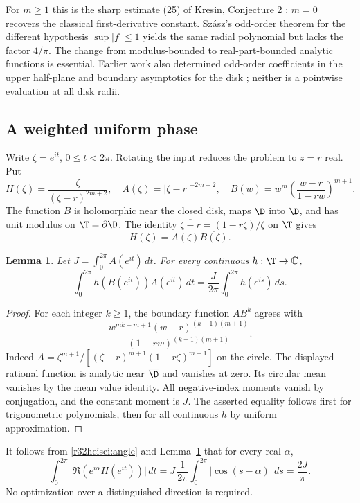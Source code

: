 \documentclass[11pt,a4paper]{article}
\numberwithin{equation}{section}
\newtheorem{lemma}[theorem]{Lemma}
\theoremstyle{definition}
\theoremstyle{remark}
\begin{document}
For $m\ge1$ this is the sharp estimate (25) of Kresin, Conjecture 2 \cite{r32heisei:K}; $m=0$ recovers the classical first-derivative constant. Sz\'asz's odd-order theorem for the different hypothesis $\sup|f|\le1$ yields the same radial polynomial but lacks the factor $4/\pi$. The change from modulus-bounded to real-part-bounded analytic functions is essential. Earlier work also determined odd-order coefficients in the upper half-plane and boundary asymptotics for the disk \cite{r32heisei:KM}; neither is a pointwise evaluation at all disk radii.

\subsection{A weighted uniform phase}
Write $\zeta=e^{it}$, $0\le t<2\pi$. Rotating the input reduces the problem to $z=r$ real. Put
\[
 H(\zeta)=\frac{\zeta}{(\zeta-r)^{2m+2}},\quad
 A(\zeta)=|\zeta-r|^{-2m-2},\quad
 B(w)=w^m\left(\frac{w-r}{1-rw}\right)^{m+1}.
\]
The function $B$ is holomorphic near the closed disk, maps $\D$ into $\D$, and has unit modulus on $\T=\partial\D$. The identity $\overline{\zeta-r}=(1-r\zeta)/\zeta$ on $\T$ gives
\begin{equation}\label{r32heisei:angle}
 H(\zeta)=A(\zeta)\overline{B(\zeta)}.
\end{equation}

\begin{lemma}\label{r32heisei:push}
Let $J=\int_0^{2\pi} A(e^{it})\,dt$. For every continuous $h:\T\to\mathbb C$,
\[
 \int_0^{2\pi} h(B(e^{it})) A(e^{it})\,dt
       =\frac{J}{2\pi}\int_0^{2\pi}h(e^{is})\,ds.
\]
\end{lemma}
\begin{proof}
For each integer $k\ge1$, the boundary function $AB^k$ agrees with
\[
 \frac{w^{mk+m+1}(w-r)^{(k-1)(m+1)}}
 {(1-rw)^{(k+1)(m+1)}}.
\]
Indeed $A=\zeta^{m+1}/[(\zeta-r)^{m+1}(1-r\zeta)^{m+1}]$ on the circle. The displayed rational function is analytic near $\overline\D$ and vanishes at zero. Its circular mean vanishes by the mean value identity. All negative-index moments vanish by conjugation, and the constant moment is $J$. The asserted equality follows first for trigonometric polynomials, then for all continuous $h$ by uniform approximation.
\end{proof}

It follows from \eqref{r32heisei:angle} and Lemma~\ref{r32heisei:push} that for every real $\alpha$,
\begin{equation}\label{r32heisei:average}
 \int_0^{2\pi}\bigl|\Re(e^{i\alpha}H(e^{it}))\bigr|\,dt
   =J\,\frac{1}{2\pi}\int_0^{2\pi}|\cos(s-\alpha)|\,ds
   =\frac{2J}{\pi}.
\end{equation}
No optimization over a distinguished direction is required.
\end{document}
